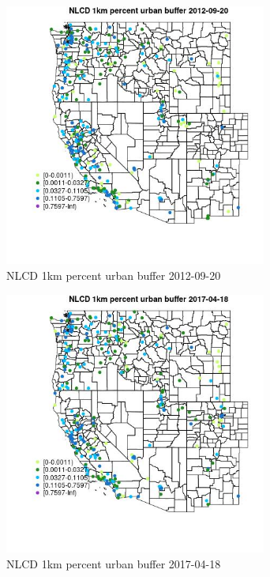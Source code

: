 \begin{figure} 
\centering  
\includegraphics[width=0.77\textwidth]{Code_Outputs/Report_ML_input_PM25_Step4_part_e_de_duplicated_aves_compiled_2019-05-14wNAs_MapObsNLCD_1km_percent_urban_buffer2012-09-20.jpg} 
\caption{\label{fig:Report_ML_input_PM25_Step4_part_e_de_duplicated_aves_compiled_2019-05-14wNAsMapObsNLCD_1km_percent_urban_buffer2012-09-20}NLCD 1km percent urban buffer 2012-09-20} 
\end{figure} 
 

\begin{figure} 
\centering  
\includegraphics[width=0.77\textwidth]{Code_Outputs/Report_ML_input_PM25_Step4_part_e_de_duplicated_aves_compiled_2019-05-14wNAs_MapObsNLCD_1km_percent_urban_buffer2017-04-18.jpg} 
\caption{\label{fig:Report_ML_input_PM25_Step4_part_e_de_duplicated_aves_compiled_2019-05-14wNAsMapObsNLCD_1km_percent_urban_buffer2017-04-18}NLCD 1km percent urban buffer 2017-04-18} 
\end{figure} 
 

